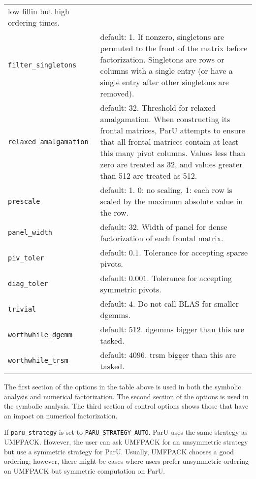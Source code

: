 \documentclass[12pt]{article}
\begin{document}
{\begin{tabular}{|lp{4.7in}|}
        low fillin but high ordering times.
        \\
    \verb'filter_singletons' & default: 1. If nonzero, singletons are
        permuted to the front of the matrix before factorization.  Singletons
        are rows or columns with a single entry (or have a single entry after
        other singletons are removed). \\
    \verb'relaxed_amalgamation' & default: 32. Threshold for relaxed
        amalgamation. When constructing its frontal matrices, ParU attempts to
        ensure that all frontal matrices contain at least this many pivot
        columns.  Values less than zero are treated as 32, and values greater
        than 512 are treated as 512. \\
    \hline
    \verb'prescale' & default: 1. 0: no scaling,
        1: each row is scaled by the maximum
        absolute value in the row. \\
    \verb'panel_width' & default: 32. Width of panel for dense factorization of
        each frontal matrix. \\
    \verb'piv_toler' & default: $0.1$. Tolerance for accepting sparse pivots. \\
    \verb'diag_toler' & default: $0.001$. Tolerance for accepting symmetric
        pivots. \\
    \verb'trivial' & default: $4$. Do not call BLAS for smaller dgemms. \\
    \verb'worthwhile_dgemm' & default: $512$. dgemms bigger than this are
        tasked. \\
    \verb'worthwhile_trsm' & default: $4096$. trsm bigger than this are
        tasked.  \\
    \hline
    \end{tabular}
    }
    \vspace{0.1in}

    The first section of the options in the table above is used in both the
    symbolic analysis and numerical factorization.  The second section of the
    options is used in the symbolic analysis.  The third section of control
    options shows those that have an impact on numerical factorization.

    If \verb'paru_strategy' is set to \verb'PARU_STRATEGY_AUTO'.  ParU uses the
    same strategy as UMFPACK. However, the user can ask UMFPACK for an
    unsymmetric strategy but use a symmetric strategy for ParU. Usually,
    UMFPACK chooses a good ordering; however, there might be cases where users
    prefer unsymmetric ordering on UMFPACK but symmetric computation on ParU.
\end{document}
